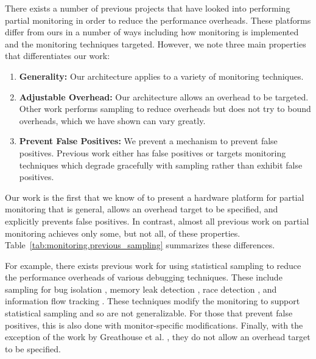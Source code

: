 There exists a number of previous projects that have looked into performing
partial monitoring in order to reduce the performance overheads. These
platforms differ from ours in a number of ways including how monitoring is
implemented and the monitoring techniques targeted. However, we note three main
properties that differentiates our work:
\begin{enumerate}
  \item \textbf{Generality:} Our architecture applies to a variety of monitoring techniques.
  \item \textbf{Adjustable Overhead:} Our architecture allows an overhead to be
  targeted. Other work performs sampling to reduce overheads but does not try
  to bound overheads, which we have shown can vary greatly.
  \item \textbf{Prevent False Positives:} We prevent a mechanism to prevent
  false positives. Previous work either has false positives or targets monitoring
  techniques which degrade gracefully with sampling rather than exhibit false
  positives.
\end{enumerate}
Our work is the first that we know of to present a hardware platform for partial
monitoring that is general, allows an overhead target to be specified, and
explicitly prevents false positives. In contrast, almost all previous work on
partial monitoring achieves only some, but not all, of these properties.
Table~\ref{tab:monitoring.previous_sampling} summarizes these differences. 

For example, there exists previous work for using statistical sampling to
reduce the performance overheads of various debugging techniques. These include
sampling for bug isolation \cite{liblit-pldi05}, memory leak detection
\cite{chilimbi-asplos04}, race detection \cite{literace-pldi09, pacer-pldi10},
and information flow tracking \cite{testudo-micro08, greathouse-cgo11}. These
techniques modify the monitoring to support statistical sampling and so are not
generalizable. For those that prevent false positives, this is also done with
monitor-specific modifications. Finally, with the exception of the work by
Greathouse et al. \cite{greathouse-cgo11}, they do not allow an overhead target
to be specified.

